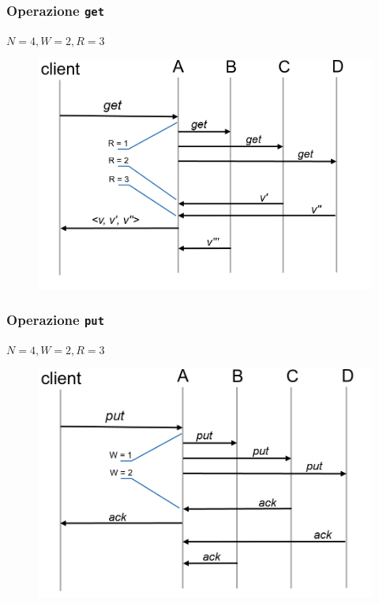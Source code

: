 \begin{frame}
  \frametitle{Operazione \texttt{get}}
  $N = 4, W = 2, R = 3$
  \begin{figure}
  \centering
  \includegraphics[scale=0.38]{dynamo/get.png}
  \end{figure}
\end{frame}


\begin{frame}
  \frametitle{Operazione \texttt{put}}
  $N = 4, W = 2, R = 3$
  \begin{figure}
  \centering
  \includegraphics[scale=0.38]{dynamo/put.png}
  \end{figure}
\end{frame}


